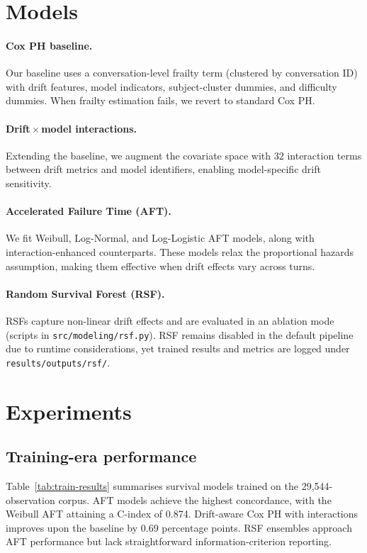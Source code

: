 ﻿\documentclass{article}
\begin{document}
\section{Models}
\paragraph{Cox PH baseline.} Our baseline uses a conversation-level frailty term (clustered by conversation ID) with drift features, model indicators, subject-cluster dummies, and difficulty dummies. When frailty estimation fails, we revert to standard Cox PH.
\paragraph{Drift\,$\times$\,model interactions.} Extending the baseline, we augment the covariate space with 32 interaction terms between drift metrics and model identifiers, enabling model-specific drift sensitivity.
\paragraph{Accelerated Failure Time (AFT).} We fit Weibull, Log-Normal, and Log-Logistic AFT models, along with interaction-enhanced counterparts. These models relax the proportional hazards assumption, making them effective when drift effects vary across turns.
\paragraph{Random Survival Forest (RSF).} RSFs capture non-linear drift effects and are evaluated in an ablation mode (scripts in \texttt{src/modeling/rsf.py}). RSF remains disabled in the default pipeline due to runtime considerations, yet trained results and metrics are logged under \texttt{results/outputs/rsf/}.

\section{Experiments}
\subsection{Training-era performance}
Table~\ref{tab:train-results} summarises survival models trained on the 29,544-observation corpus. AFT models achieve the highest concordance, with the Weibull AFT attaining a C-index of 0.874. Drift-aware Cox PH with interactions improves upon the baseline by 0.69 percentage points. RSF ensembles approach AFT performance but lack straightforward information-criterion reporting.
\end{document}
